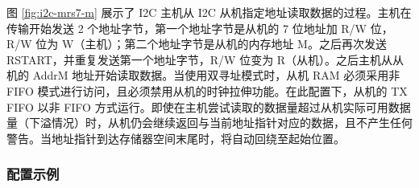 \documentclass[main\_\_CN.tex]{subfiles}
\begin{document}
图 \ref{fig:i2c-mrs7-m} 展示了 I2C 主机从 I2C 从机指定地址读取数据的过程。主机在传输开始发送 2 个地址字节，第一个地址字节是从机的 7 位地址加 R/W 位，R/W 位为 W（主机）；第二个地址字节是从机的内存地址 M。之后再次发送 RSTART，并重复发送第一个地址字节，R/W 位变为 R（从机）。之后主机从从机的 AddrM 地址开始读取数据。当使用双寻址模式时，从机 RAM 必须采用非 FIFO 模式进行访问，且必须禁用从机的时钟拉伸功能。在此配置下，从机的 TX FIFO 以非 FIFO 方式运行。即使在主机尝试读取的数据量超过从机实际可用数据量（下溢情况）时，从机仍会继续返回与当前地址指针对应的数据，且不产生任何警告。当地址指针到达存储器空间末尾时，将自动回绕至起始位置。

\subsubsection{配置示例}
\end{document}
